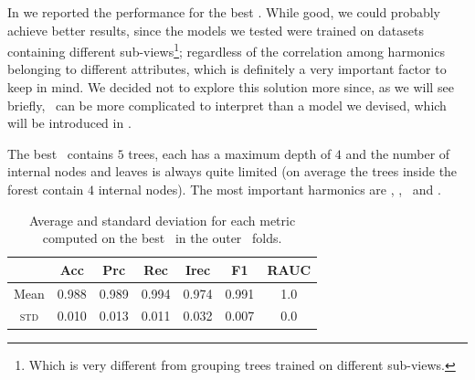 In  we reported the performance for the best \rf. While good, we could probably achieve better
results, since the models we tested were trained on datasets containing different sub-views\footnote{
	Which is very different from grouping trees trained on different sub-views.
}; regardless of the correlation among harmonics belonging to different attributes, which is
definitely a very important factor to keep in mind. We decided not to explore this solution more
since, as we will see briefly, \rfs\ can be more complicated to interpret than a model we devised,
which will be introduced in .

The best \rf\ contains $5$ trees, each has a maximum depth of $4$ and the number of
internal nodes and leaves is always quite limited (on average the trees inside the forest contain
$4$ internal nodes). The most important harmonics are \cnmod[2], \cnmod[5], \phin[6]\ and \phin[10].
\begin{table}[!ht]
	\caption{Average and standard deviation for each metric computed on the best \rf\ in the outer \cv\ folds.}\label{tbl:rf-cnmod-phi-perf}

	\bigskip
	\setlength{\tabcolsep}{6pt}
	\centering
	\begin{tabular}{ccccccc}
		\toprule
		\textbf{}    & \textbf{Acc} & \textbf{Prc} & \textbf{Rec} & \textbf{Irec} & \textbf{F1} & \textbf{RAUC} \\
		\midrule
		Mean         & 0.988        & 0.989        & 0.994        & 0.974         & 0.991
		             & 1.0                                                                                      \\
		\textsc{std} & 0.010        & 0.013        & 0.011        & 0.032         & 0.007
		             & 0.0                                                                                      \\
		\bottomrule
	\end{tabular}
\end{table}

